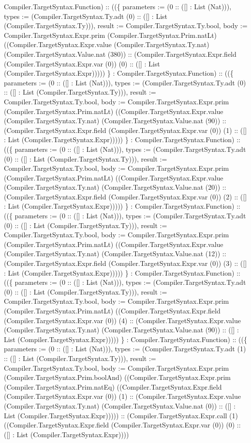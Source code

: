\documentclass[11pt]{article}
\begin{document}
Compiler.TargetSyntax.Function) :: ((\{ parameters := (0 :: ([] : List (Nat))), types := (Compiler.TargetSyntax.Ty.adt (0) :: ([] : List (Compiler.TargetSyntax.Ty))), result := Compiler.TargetSyntax.Ty.bool, body := Compiler.TargetSyntax.Expr.prim (Compiler.TargetSyntax.Prim.natLt) ((Compiler.TargetSyntax.Expr.value (Compiler.TargetSyntax.Ty.nat) (Compiler.TargetSyntax.Value.nat (380)) :: (Compiler.TargetSyntax.Expr.field (Compiler.TargetSyntax.Expr.var (0)) (0) :: ([] : List (Compiler.TargetSyntax.Expr))))) \} : Compiler.TargetSyntax.Function) :: ((\{ parameters := (0 :: ([] : List (Nat))), types := (Compiler.TargetSyntax.Ty.adt (0) :: ([] : List (Compiler.TargetSyntax.Ty))), result := Compiler.TargetSyntax.Ty.bool, body := Compiler.TargetSyntax.Expr.prim (Compiler.TargetSyntax.Prim.natLt) ((Compiler.TargetSyntax.Expr.value (Compiler.TargetSyntax.Ty.nat) (Compiler.TargetSyntax.Value.nat (90)) :: (Compiler.TargetSyntax.Expr.field (Compiler.TargetSyntax.Expr.var (0)) (1) :: ([] : List (Compiler.TargetSyntax.Expr))))) \} : Compiler.TargetSyntax.Function) :: ((\{ parameters := (0 :: ([] : List (Nat))), types := (Compiler.TargetSyntax.Ty.adt (0) :: ([] : List (Compiler.TargetSyntax.Ty))), result := Compiler.TargetSyntax.Ty.bool, body := Compiler.TargetSyntax.Expr.prim (Compiler.TargetSyntax.Prim.natLt) ((Compiler.TargetSyntax.Expr.value (Compiler.TargetSyntax.Ty.nat) (Compiler.TargetSyntax.Value.nat (20)) :: (Compiler.TargetSyntax.Expr.field (Compiler.TargetSyntax.Expr.var (0)) (2) :: ([] : List (Compiler.TargetSyntax.Expr))))) \} : Compiler.TargetSyntax.Function) :: ((\{ parameters := (0 :: ([] : List (Nat))), types := (Compiler.TargetSyntax.Ty.adt (0) :: ([] : List (Compiler.TargetSyntax.Ty))), result := Compiler.TargetSyntax.Ty.bool, body := Compiler.TargetSyntax.Expr.prim (Compiler.TargetSyntax.Prim.natLt) ((Compiler.TargetSyntax.Expr.value (Compiler.TargetSyntax.Ty.nat) (Compiler.TargetSyntax.Value.nat (12)) :: (Compiler.TargetSyntax.Expr.field (Compiler.TargetSyntax.Expr.var (0)) (3) :: ([] : List (Compiler.TargetSyntax.Expr))))) \} : Compiler.TargetSyntax.Function) :: ((\{ parameters := (0 :: ([] : List (Nat))), types := (Compiler.TargetSyntax.Ty.adt (0) :: ([] : List (Compiler.TargetSyntax.Ty))), result := Compiler.TargetSyntax.Ty.bool, body := Compiler.TargetSyntax.Expr.prim (Compiler.TargetSyntax.Prim.natLt) ((Compiler.TargetSyntax.Expr.field (Compiler.TargetSyntax.Expr.var (0)) (4) :: (Compiler.TargetSyntax.Expr.value (Compiler.TargetSyntax.Ty.nat) (Compiler.TargetSyntax.Value.nat (90)) :: ([] : List (Compiler.TargetSyntax.Expr))))) \} : Compiler.TargetSyntax.Function) :: ((\{ parameters := (0 :: ([] : List (Nat))), types := (Compiler.TargetSyntax.Ty.adt (1) :: ([] : List (Compiler.TargetSyntax.Ty))), result := Compiler.TargetSyntax.Ty.bool, body := Compiler.TargetSyntax.Expr.prim (Compiler.TargetSyntax.Prim.boolAnd) ((Compiler.TargetSyntax.Expr.prim (Compiler.TargetSyntax.Prim.natEq) ((Compiler.TargetSyntax.Expr.field (Compiler.TargetSyntax.Expr.var (0)) (1) :: (Compiler.TargetSyntax.Expr.value (Compiler.TargetSyntax.Ty.nat) (Compiler.TargetSyntax.Value.nat (0)) :: ([] : List (Compiler.TargetSyntax.Expr))))) :: (Compiler.TargetSyntax.Expr.call (1) ((Compiler.TargetSyntax.Expr.field (Compiler.TargetSyntax.Expr.var (0)) (0) :: ([] : List (Compiler.TargetSyntax.Expr)))) 
\end{document}
